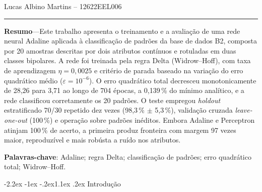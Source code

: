 \documentclass[12pt,a4paper]{article}
\makeatletter
\renewcommand\section{\@startsection{section}{1}{\z@}%
  {-2.2ex \@plus -1ex \@minus -.2ex}{1.1ex \@plus .2ex}%
  {\normalfont\large\bfseries}}
\makeatother
\begin{document}
\justifying

\fazcapa
\fazfolhaderosto

\setcounter{page}{1}

\begin{center}
  {\fontsize{13}{16}\selectfont\bfseries \TituloTexto\par}
  \vspace{0.2cm}
  {\fontsize{11}{13}\selectfont Lucas Albino Martins -- 12622EEL006\par}
  \vspace{0.1cm}
  \rule{0.45\textwidth}{0.6pt}
\end{center}

\vspace{0.1cm}

{\small\singlespacing\noindent
\textbf{Resumo}\;---\;Este trabalho apresenta o treinamento e a avalia\c{c}\~ao de
uma rede neural Adaline aplicada \`a classifica\c{c}\~ao de padr\~oes da base de
dados B2, composta por 20 amostras descritas por dois atributos cont\'inuos e
rotuladas em duas classes bipolares. A rede foi treinada pela regra Delta
(Widrow--Hoff), com taxa de aprendizagem $\eta = 0{,}0025$ e crit\'erio de parada
baseado na varia\c{c}\~ao do erro quadr\'atico m\'edio ($\varepsilon = 10^{-6}$).
O erro quadr\'atico total decresceu monotonicamente de 28,26 para 3,71 ao longo de
704 \'epocas, a 0,139\,\% do m\'inimo anal\'itico, e a rede classificou corretamente
os 20 padr\~oes. O teste empregou \textit{holdout} estratificado 70/30 repetido dez
vezes (98,3\,\% $\pm$ 5,3\,\%), valida\c{c}\~ao cruzada \textit{leave-one-out}
(100\,\%) e opera\c{c}\~ao sobre padr\~oes in\'editos. Embora Adaline e Perceptron
atinjam 100\,\% de acerto, a primeira produz fronteira com margem 97 vezes maior,
reproduz\'ivel e mais rob\'usta a ru\'ido nos atributos.\par
\vspace{0.15cm}
\noindent\textbf{Palavras-chave}: Adaline; regra Delta; classifica\c{c}\~ao de
padr\~oes; erro quadr\'atico total; Widrow--Hoff.\par}

\vspace{0.25cm}

\section{Introdu\c{c}\~ao}
\end{document}
